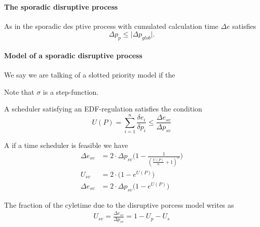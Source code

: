 	\paragraph{The sporadic disruptive process}
	
	As in \cite{K} the sporadic des
	ptive process with cumulated calculation time $\Delta e$ satisfies
	\begin{equation}
	\Delta p_{p} \leq \lvert{\Delta p_{glob}} \rvert. 
	\end{equation}
	
	\paragraph{Model of a sporadic disruptive process}
	
	We say we are talking of a slotted priority model if the 
	
	\begin{remark}
	Note that $\sigma$ is a step-function. 
	\end{remark}
	
	
	\begin{remark} A scheduler satisfying an EDF-regulation satisfies the condition
		\begin{equation}
		U(P) = \sum\limits_{i=1}^n \frac{\delta e_i}{\delta p_i} \leq 		\frac{\Delta e_{sv}}{\Delta p_{sv}}
		\end{equation}
	\end{remark}
	
	\begin{theorem}
	A if a time scheduler is feasible we have
		\begin{subequations} 
		\begin{align}
		 \Delta e_{sv} &= 2 \cdot \Delta p_{sv} \Big( 1- \frac{1}{(\frac{U(P)}{
		 n}+1)^n} \Big)\\
		 U_{sv} &= 2 \cdot \Big( 1-e^{U(P)} \Big)\\
		 \Delta e_{sv} &= 2 \cdot \Delta p_{sv} \Big( 1 -e ^{U(P)} \Big) 
		\end{align}
		\end{subequations}
	\end{theorem}
	
	\begin{theorem}
	The fraction of the cyletime due to the disruptive porcess model writes as 
		\begin{subequations} 
		\begin{align}
		U_{sv} = \frac{\Delta e_{sv}}{\Delta p_{sv}} = 1 - U_p - U_s
		\end{align}
		\end{subequations}
	\end{theorem}
	
